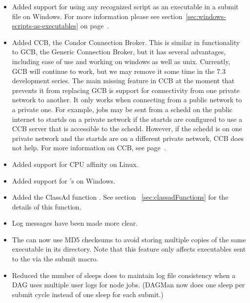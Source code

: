 \begin{itemize}

\item Added support for using any recognized script as an executable
in a submit file on Windows. For more information please see
section~\ref{sec:windows-scripts-as-executables} on
page~\pageref{sec:windows-scripts-as-executables}.

\item Added CCB, the Condor Connection Broker.  This is similar in
functionality to GCB, the Generic Connection Broker, but it has
several advantages, including ease of use and working on windows as
well as unix.  Currently, GCB will continue to work, but we may remove
it some time in the 7.3 development series.  The main missing feature
in CCB at the moment that prevents it from replacing GCB is support
for connectivity from one private network to another.  It only works
when connecting from a public network to a private one.  For example,
jobs may be sent from a schedd on the public internet to startds on a
private network if the startds are configured to use a CCB server that
is accessible to the schedd.  However, if the schedd is on one private
network and the startds are on a different private network, CCB does
not help.  For more information on CCB, see page~\pageref{sec:CCB}.

\item Added support for CPU affinity on Linux.

\item Added support for 's  on Windows.

\item Added the ClassAd function .
See section~ \ref{sec:classadFunctions} for the details of this function.

\item Log messages have been made more clear.

\item The  can now use MD5 checksums to avoid storing
multiple copies of the same executable in its  directory.
Note that this feature only affects executables sent to the
 via the  submit macro.

\item Reduced the number of sleeps  does to maintain log
file consistency when a DAG uses multiple user logs for node jobs.
(DAGMan now does one sleep per submit cycle instead of one sleep for
each submit.)

\end{itemize}

